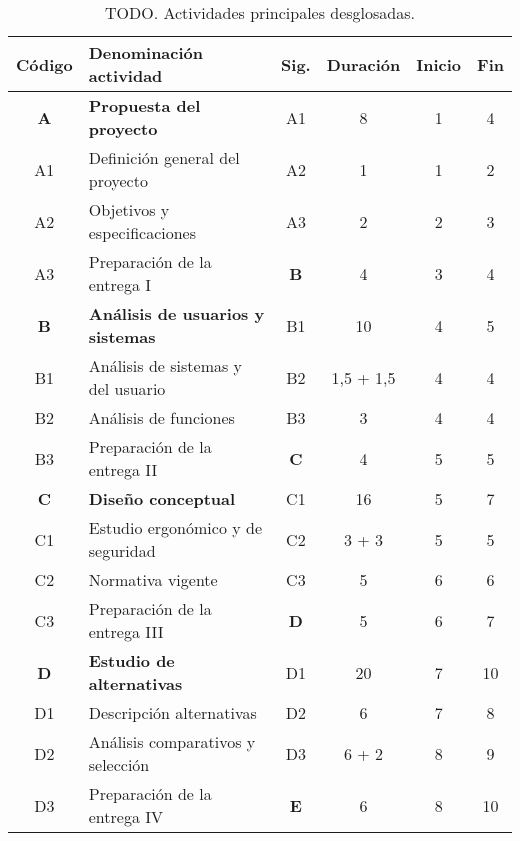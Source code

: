 \begin{table}[p]
  \centering
  \caption[TODO]{TODO. Actividades principales desglosadas.}
  \label{tab:activities-desglosadas}
  \begin{tabular}{clcccc}
    \toprule
    \rowcolor{gray!37.5}
    \bf Código & \bf Denominación actividad & \bf Sig. & \bf Duración & \bf Inicio & \bf Fin \\
    \midrule

    \rowcolor{gray!7.5}
    \textbf{A} & \bf Propuesta del proyecto      & A1    & 8 & 1 & 4 \\
    \rowcolor{gray!7.5}
    A1         & Definición general del proyecto & A2    & 1 & 1 & 2 \\
    \rowcolor{gray!7.5}
    A2         & Objetivos y especificaciones    & A3    & 2 & 2 & 3 \\
    \rowcolor{gray!7.5}
    A3         & Preparación de la entrega I     & \bf B & 4 & 3 & 4 \\
    \midrule

    \textbf{B} & \bf Análisis de usuarios y sistemas & B1    & 10        & 4 & 5 \\
    B1         & Análisis de sistemas y del usuario  & B2    & 1,5 + 1,5 & 4 & 4 \\
    B2         & Análisis de funciones               & B3    & 3         & 4 & 4 \\
    B3         & Preparación de la entrega II        & \bf C & 4         & 5 & 5 \\
    \midrule

    \rowcolor{gray!7.5}
    \textbf{C} & \bf Diseño conceptual             & C1    & 16    & 5 & 7 \\
    \rowcolor{gray!7.5}
    C1         & Estudio ergonómico y de seguridad & C2    & 3 + 3 & 5 & 5 \\
    \rowcolor{gray!7.5}
    C2         & Normativa vigente                 & C3    & 5     & 6 & 6 \\
    \rowcolor{gray!7.5}
    C3         & Preparación de la entrega III     & \bf D & 5     & 6 & 7 \\
    \midrule

    \textbf{D} & \bf Estudio de alternativas       & D1    & 20    & 7 & 10 \\
    D1         & Descripción alternativas          & D2    & 6     & 7 & 8  \\
    D2         & Análisis comparativos y selección & D3    & 6 + 2 & 8 & 9  \\
    D3         & Preparación de la entrega IV      & \bf E & 6     & 8 & 10 \\
    \midrule


\end{tabular}
\end{table}
